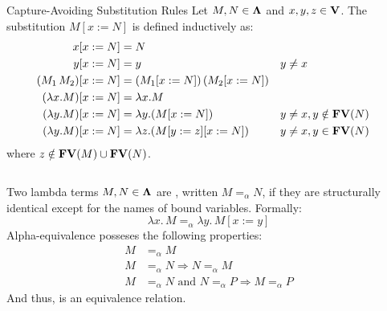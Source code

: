 \documentclass[12pt]{book}
\newcommand{\subst}[2]{[#1 := #2]}    %
\newcommand{\lam}[2]{\lambda #1.\,#2} %
\begin{document}
\begin{definition}Capture-Avoiding Substitution Rules
  Let \( M, N \in \mathbf{\Lambda} \) and \( x, y, z \in \mathbf{V} \). The substitution \( M[x := N] \) is defined inductively as:
  \[
    \begin{aligned}
      x[x := N]                       & = N \\
      y[x := N]                       & = y && y \neq x \\
      (M_1\, M_2)[x := N]             & = (M_1[x := N])\,(M_2[x := N]) \\
      (\lambda x. M)[x := N]          & = \lambda x. M \\
      (\lambda y. M)[x := N]          & = \lambda y. (M[x := N]) && y \neq x, y \notin \mathbf{FV}( N ) \\
      (\lambda y. M)[x := N]          & = \lambda z. (M[y := z][x := N]) && y \neq x, y \in \mathbf{FV}( N )
    \end{aligned}
  \]
  where \( z \notin \mathbf{FV}( M ) \cup \mathbf{FV}( N ) \).
  \begin{lstlisting}[style=haskellstyle,caption={asdasdasd}]

  \end{lstlisting}
\end{definition}
\begin{definition} Two lambda terms \( M, N \in \mathbf{\Lambda} \) are \aequivlt, written \( M =_\alpha N \), if they are structurally identical except for the names of bound variables.
  Formally:
  \[
    \lam{x}{M} =_\alpha \lam{y}{M\subst{x}{y}}
  \]
  Alpha-equivalence posseses the following properties:
  \[
    \begin{aligned}
      M &=_\alpha M \\
      M &=_\alpha N \Rightarrow N =_\alpha M \\ 
      M &=_\alpha N \text{ and } N =_\alpha P \Rightarrow M =_\alpha P
    \end{aligned}
  \]
  And thus, is an equivalence relation.
\end{definition}
\end{document}
